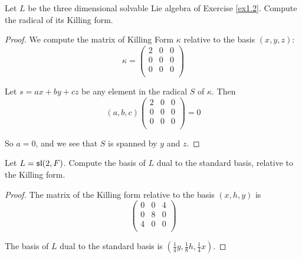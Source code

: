 \begin{ex}
  Let $L$ be the three dimensional solvable Lie algebra of Exercise \ref{ex1.2}. Compute the radical of its Killing form.
\end{ex}
\begin{proof}
  We compute the matrix of Killing Form $\kappa$ relative to the basis $(x, y, z)$:
  \begin{equation*}
    \kappa=
    \begin{pmatrix}
      2 & 0 & 0 \\
      0 & 0 & 0 \\
      0 & 0 & 0 \\
    \end{pmatrix}
  \end{equation*}

  Let $s = ax + by + cz$ be any element in the radical $S$ of $\kappa$. Then
  \begin{equation*}
    (a,b,c)
    \begin{pmatrix}
      2 & 0 & 0 \\
      0 & 0 & 0 \\
      0 & 0 & 0 \\
    \end{pmatrix}
    =0
  \end{equation*}

  So $a=0$, and we see that $S$ is spanned by $y$ and $z$.
\end{proof}

\begin{ex}\label{5.5}
  Let $L = \sl(2,F)$. Compute the basis of $L$ dual to the standard basis, relative to the Killing form.
\end{ex}
\begin{proof}
  The matrix of the Killing form relative to the basis $(x,h,y)$ is
  \begin{equation*}
    \begin{pmatrix}
      0 & 0 & 4 \\
      0 & 8 & 0 \\
      4 & 0 & 0 \\
    \end{pmatrix}
  \end{equation*}

  The basis of $L$ dual to the standard basis is $(\frac{1}{4}y, \frac{1}{8}h, \frac{1}{4}x)$.
\end{proof}

